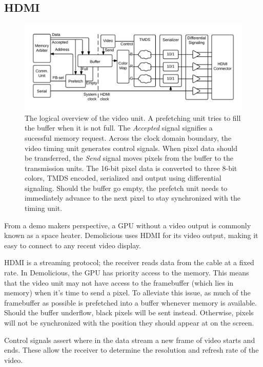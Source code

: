 \documentclass[../main/report.tex]{subfiles}
\begin{document}
\subsection{HDMI}
\begin{figure}
	\centering
	\includegraphics[width=\textwidth]{../gpu/diagrams/HDMI_overview.png}
	\caption{
		The logical overview of the video unit.
		A prefetching unit tries to fill the buffer when it is not full.
		The \emph{Accepted} signal signifies a sucessful memory request.
		Across the clock domain boundary, the video timing unit generates control signals.
		When pixel data should be transferred, the \emph{Send} signal moves pixels from the buffer to the transmission units.
		The 16-bit pixel data is converted to three 8-bit colors, TMDS encoded, serialized and output using differential signaling.
		Should the buffer go empty, the prefetch unit needs to immediately advance to the next pixel to stay synchronized with the timing unit.
	}
	\label{fig:video_unit}
\end{figure}

From a demo makers perspective, a GPU without a video output is commonly known as a space heater.
Demolicious uses HDMI for its video output, making it easy to connect to any recent video display.

HDMI is a streaming protocol; the receiver reads data from the cable at a fixed rate.
In Demolicious, the GPU has priority access to the memory.
This means that the video unit may not have access to the framebuffer (which lies in memory) when it's time to send a pixel.
To alleviate this issue, as much of the framebuffer as possible is prefetched into a buffer whenever memory is available.
Should the buffer underflow, black pixels will be sent instead.
Otherwise, pixels will not be synchronized with the position they should appear at on the screen.

Control signals assert where in the data stream a new frame of video starts and ends.
These allow the receiver to determine the resolution and refresh rate of the video.
\end{document}

